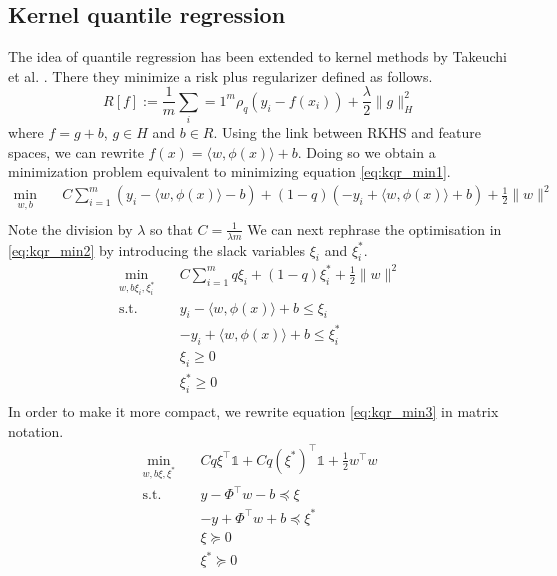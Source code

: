 \subsection{Kernel quantile regression}
The idea of quantile regression has been extended to kernel methods by Takeuchi et al. \cite{takeuchi2006nonparametric}.
There they minimize a risk plus regularizer defined as follows.
\begin{equation}\label{eq:kqr_min1}
    R[f]:=\frac{1}{m}\sum\limits_i=1^{m}\rho_q(y_i-f(x_i))+\frac{\lambda}{2}\|g\|_H^2
\end{equation}
where $f=g+b$, $g \in H$ and $b \in R$.
Using the link between RKHS and feature spaces, we can rewrite $f(x)=\langle w, \phi(x) \rangle+b$. Doing so we obtain a minimization problem equivalent to minimizing equation \ref{eq:kqr_min1}.
\begin{equation}\label{eq:kqr_min2}
    \begin{aligned}
    \min_{w,b} \quad & C \sum \limits_{i=1}^{m}
    (y_i-\langle w, \phi(x) \rangle-b)+ (1-q)(-y_i+\langle w, \phi(x) \rangle+b)+ \frac{1}{2}\|w\|^2\\
    \end{aligned}
    \end{equation}
Note the division by $\lambda$ so that $C=\frac{1}{\lambda m}$
We can next rephrase the optimisation in \ref{eq:kqr_min2} by introducing the slack variables $\xi_i$ and $\xi_i^*$.
\begin{equation}\label{eq:kqr_min3}
    \begin{aligned}
        \min_{w,b\xi_i,\xi_i^*} \quad & C \sum \limits_{i=1}^{m}
        q \xi_i+ (1-q)\xi_i^*+ \frac{1}{2}\|w\|^2\\
    \textrm{s.t.} \quad & y_i-\langle w, \phi(x) \rangle+b \leq \xi_i\\
    & -y_i+\langle w, \phi(x) \rangle+b \leq \xi_i^*\\
      &\xi_i\geq0    \\
      &\xi_i^*\geq0    \\
    \end{aligned}
    \end{equation}
In order to make it more compact, we rewrite equation \ref{eq:kqr_min3} in matrix notation.
\begin{equation}\label{eq:kqr_min4}
    \begin{aligned}
        \min_{w,b\xi,\xi^*} \quad & C q \xi^\intercal \mathbb{1}+ C q (\xi^*)^\intercal \mathbb{1}+ \frac{1}{2}w^\intercal w\\
    \textrm{s.t.} \quad & y-\Phi^\intercal w -b \preceq \xi\\
    & -y+\Phi^\intercal w +b \preceq \xi^*\\
      &\xi\succeq0    \\
      &\xi^*\succeq0    \\
    \end{aligned}
    \end{equation}
